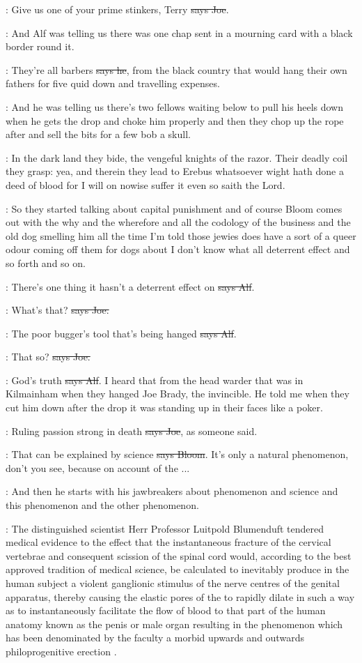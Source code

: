 \joe:
Give us one of your prime stinkers,
Terry \sout{says Joe}.

\Nq:
And Alf was telling us there was one chap sent in a mourning card
with a black border round it.

\bergan:
They're all barbers \sout{says he},
from the black country that would hang
their own fathers for five quid down and travelling expenses.

\Nq:
And he was telling us there's two fellows waiting below to pull his
heels down when he gets the drop and choke him properly and then they
chop up the rope after and sell the bits for a few bob a skull.

:
In the dark land they bide, the vengeful knights of the razor. Their
deadly coil they grasp: yea, and therein they lead to Erebus whatsoever
wight hath done a deed of blood for I will on nowise suffer it even so
saith the Lord.

\Nq:
So they started talking about capital punishment and of course Bloom
comes out with the why and the wherefore and all the codology of the
business and the old dog smelling him all the time I'm told those jewies
does have a sort of a queer odour coming off them for dogs about I don't
know what all deterrent effect and so forth and so on.

\bergan:
There's one thing it hasn't a deterrent effect
on \sout{says Alf}.

\joe:
What's that? \sout{says Joe.}

\bergan:
The poor bugger's tool that's being hanged
\sout{says Alf}.

\joe:
That so? \sout{says Joe.}

\bergan:
God's truth \sout{says Alf}.
I heard that from the head warder that was in
Kilmainham when they hanged Joe Brady, the invincible. He told me when
they cut him down after the drop it was standing up in their faces like a
poker.

\joe:
Ruling passion strong in death \sout{says Joe},
as someone said.

\Bloom:
That can be explained by science \sout{says Bloom}.
It's only a natural
phenomenon, don't you see, because on account of the ...

\Nq:
And then he starts with his jawbreakers about phenomenon and
science and this phenomenon and the other phenomenon.

:
The distinguished scientist Herr Professor Luitpold Blumenduft
tendered medical evidence to the effect that the instantaneous fracture of
the cervical vertebrae and consequent scission of the spinal cord would,
according to the best approved tradition of medical science, be calculated
to inevitably produce in the human subject a violent ganglionic stimulus
of the nerve centres of the genital apparatus, thereby causing the elastic
pores of the  to rapidly dilate in such a way as to
instantaneously facilitate the flow of blood to that part of the human
anatomy known as the penis or male organ resulting in the phenomenon which
has been denominated by the faculty a morbid upwards and outwards
philoprogenitive erection .

